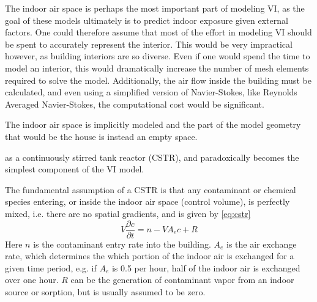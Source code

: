 The indoor air space is perhaps the most important part of modeling VI, as the goal of these models ultimately is to predict indoor exposure given external factors.
One could therefore assume that most of the effort in modeling VI should be spent to accurately represent the interior.
This would be very impractical however, as building interiors are so diverse.
Even if one would spend the time to model an interior, this would dramatically increase the number of mesh elements required to solve the model.
Additionally, the air flow inside the building must be calculated, and even using a simplified version of Navier-Stokes, like Reynolds Averaged Navier-Stokes, the computational cost would be significant.\par

The indoor air space is implicitly modeled and the part of the model geometry that would be the house is instead an empty space. 

as a continuously stirred tank reactor (CSTR), and paradoxically becomes the simplest component of the VI model.\par



The fundamental assumption of a CSTR is that any contaminant or chemical species entering, or inside the indoor air space (control volume), is perfectly mixed, i.e. there are no spatial gradients, and is given by \eqref{eq:cstr}
\begin{equation}\label{eq:cstr}
  V\frac{\partial c}{\partial t} = n - V A_e c + R
\end{equation}
Here $n$ is the contaminant entry rate into the building.
$A_e$ is the air exchange rate, which determines the which portion of the indoor air is exchanged for a given time period, e.g. if $A_e$ is 0.5 per hour, half of the indoor air is exchanged over one hour.
$R$ can be the generation of contaminant vapor from an indoor source or sorption, but is usually assumed to be zero.

